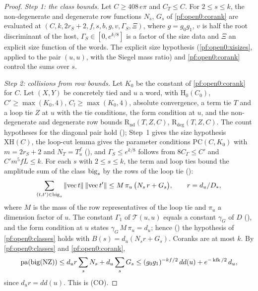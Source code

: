 \begin{proof}
\emph{Step 1: the class bounds.} Let $C\ge408\,e\pi$ and $C_T\le C$. For $2\le s\le k$, the non-degenerate and degenerate row
functions $N_s$, $G_s$ of \cref{pf:open0:corank} are evaluated at $(C,k,2r_S+2,f,s,b,g,v,\Gamma_S,\Xi)$, where $g=g_0g_1$, $v$ is
half the root discriminant of the host, $\Gamma_S\in[0,e^{k/8}]$ is a factor of the size data and $\Xi$ an explicit size function of
the words. The explicit size hypothesis (\cref{pf:open0:xisizes}, applied to the pair $(u,u)$, with the Siegel mass ratio) and
\cref{pf:open0:corank} control the sums over $s$.

\emph{Step 2: collisions from row bounds.} Let $K_0$ be the constant of \cref{pf:open0:corank} for $C$. Let $(X,Y)$ be concretely
tied and $u$ a word, with $\mathrm{H}_0(C_0)$, $C'\ge\max(K_0,4)$,
$C_l\ge\max(K_0,4)$, absolute convergence, a term tie $T$ and a loop tie $Z$ at $u$ with the tie conditions, the form condition at $u$,
and the non-degenerate and degenerate row bounds $\mathrm{R}_{\mathrm{nd}}(T,Z,C)$, $\mathrm{R}_{\mathrm{deg}}(T,Z,C)$. The count hypotheses for the
diagonal pair hold (); Step~1 gives the size hypothesis
$\mathrm{XH}(C)$, the loop-cut lemma gives the parameter conditions $\mathrm{PC}(C,K_0)$ with $m=2r_S+2$ and $N_T=T_u^f$
(), and $\Gamma_S\le e^{k/8}$ follows from
$8C_\Gamma\le C'$ and $C'm^5fL\le k$. For each $s$ with $2\le s\le k$, the term and loop ties bound the amplitude sum of the class
$\operatorname{big}_s$ by the rows of the loop tie ():
\[
\sum_{(t,t')\in\operatorname{big}_s}\|\mathrm{vec}\,t\|\,\|\mathrm{vec}\,t'\|\le M\,\pi_u\,\bigl(N_s\,r+G_s\bigr),\qquad r=d_u/D_*,
\]
where $M$ is the mass of the row representatives of the loop tie and $\pi_u$ a dimension factor of $u$. The constant $\Gamma_1$ of
$\mathcal T(u,u)$ equals a constant $\gamma_G$ of $D$ (), and the form
condition at $u$ states $\gamma_G\,M\,\pi_u=d_u$; hence () the hypothesis of
\cref{pf:open0:classes} holds with $B(s)=d_u(N_sr+G_s)$. Coranks are at most $k$. By \cref{pf:open0:classes} and
\cref{pf:open0:corank},
\[
\operatorname{pa}(\operatorname{big}(\mathrm{NZ}))\le d_ur\sum_sN_s+d_u\sum_sG_s\le(g_0g_1)^{-kf/2}\,dd(u)+e^{-\operatorname{kfk}/2}\,d_u,
\]
since $d_ur=dd(u)$. This is (CO).


\end{proof}
